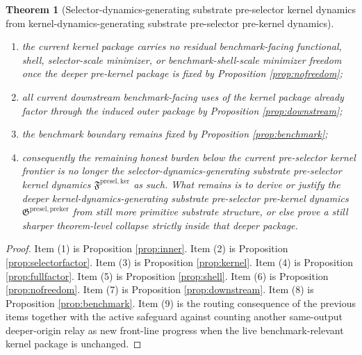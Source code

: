\documentclass[11pt]{article}
\newcommand{\KernelPackage}{\mathfrak F^{\mathrm{presel,ker}}}
\newcommand{\PreKernelPackage}{\mathfrak G^{\mathrm{presel,preker}}}
\newtheorem{theorem}{Theorem}
\begin{document}
\begin{theorem}[Selector-dynamics-generating substrate pre-selector kernel dynamics from kernel-dynamics-generating substrate pre-selector pre-kernel dynamics]
\begin{enumerate}
    \item the current kernel package carries no residual benchmark-facing functional, shell, selector-scale minimizer, or benchmark-shell-scale minimizer freedom once the deeper pre-kernel package is fixed by Proposition \ref{prop:nofreedom};
    \item all current downstream benchmark-facing uses of the kernel package already factor through the induced outer package by Proposition \ref{prop:downstream};
    \item the benchmark boundary remains fixed by Proposition \ref{prop:benchmark};
    \item consequently the remaining honest burden below the current pre-selector kernel frontier is no longer the selector-dynamics-generating substrate pre-selector kernel dynamics \(\KernelPackage\) as such. What remains is to derive or justify the deeper kernel-dynamics-generating substrate pre-selector pre-kernel dynamics \(\PreKernelPackage\) from still more primitive substrate structure, or else prove a still sharper theorem-level collapse strictly inside that deeper package.
\end{enumerate}
\end{theorem}

\begin{proof}
Item (1) is Proposition \ref{prop:inner}. Item (2) is Proposition \ref{prop:selectorfactor}. Item (3) is Proposition \ref{prop:kernel}. Item (4) is Proposition \ref{prop:fullfactor}. Item (5) is Proposition \ref{prop:shell}. Item (6) is Proposition \ref{prop:nofreedom}. Item (7) is Proposition \ref{prop:downstream}. Item (8) is Proposition \ref{prop:benchmark}. Item (9) is the routing consequence of the previous items together with the active safeguard against counting another same-output deeper-origin relay as new front-line progress when the live benchmark-relevant kernel package is unchanged.
\end{proof}
\end{document}

